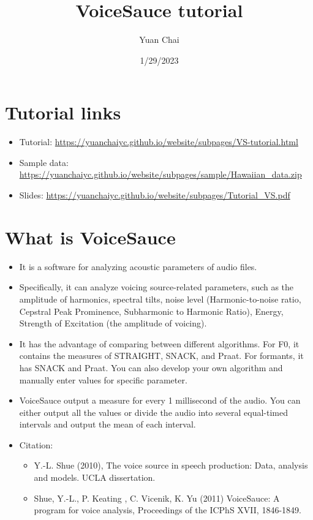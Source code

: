\documentclass[
]{article}
\title{VoiceSauce tutorial}
\author{Yuan Chai}
\date{1/29/2023}
\providecommand{\tightlist}{%
  \setlength{\itemsep}{0pt}\setlength{\parskip}{0pt}}
\begin{document}
\maketitle

{
\setcounter{tocdepth}{3}
\tableofcontents
}
\hypertarget{tutorial-links}{%
\section{Tutorial links}\label{tutorial-links}}

\begin{itemize}
\tightlist
\item
  Tutorial:
  \url{https://yuanchaiyc.github.io/website/subpages/VS-tutorial.html}
\item
  Sample data:
  \url{https://yuanchaiyc.github.io/website/subpages/sample/Hawaiian_data.zip}
\item
  Slides:
  \url{https://yuanchaiyc.github.io/website/subpages/Tutorial_VS.pdf}
\end{itemize}

\hypertarget{what-is-voicesauce}{%
\section{What is VoiceSauce}\label{what-is-voicesauce}}

\begin{itemize}
\item
  It is a software for analyzing acoustic parameters of audio files.
\item
  Specifically, it can analyze voicing source-related parameters, such
  as the amplitude of harmonics, spectral tilts, noise level
  (Harmonic-to-noise ratio, Cepstral Peak Prominence, Subharmonic to
  Harmonic Ratio), Energy, Strength of Excitation (the amplitude of
  voicing).
\item
  It has the advantage of comparing between different algorithms. For
  F0, it contains the measures of STRAIGHT, SNACK, and Praat. For
  formants, it has SNACK and Praat. You can also develop your own
  algorithm and manually enter values for specific parameter.
\item
  VoiceSauce output a measure for every 1 millisecond of the audio. You
  can either output all the values or divide the audio into several
  equal-timed intervals and output the mean of each interval.
\item
  Citation:

  \begin{itemize}
  \tightlist
  \item
    Y.-L. Shue (2010), The voice source in speech production: Data,
    analysis and models. UCLA dissertation.
  \item
    Shue, Y.-L., P. Keating , C. Vicenik, K. Yu (2011) VoiceSauce: A
    program for voice analysis, Proceedings of the ICPhS XVII,
    1846-1849.
  \end{itemize}
\end{itemize}
\end{document}
